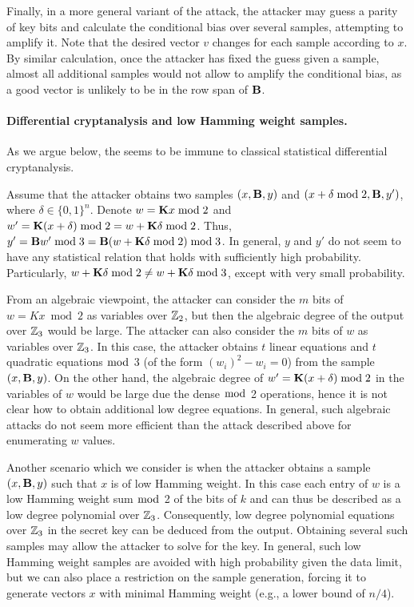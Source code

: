 Finally, in a more general variant of the attack,
the attacker may guess a parity of key bits and calculate the conditional bias over several samples,
attempting to amplify it.
Note that the desired vector $v$ changes for each sample according to $x$.
By similar calculation, once the attacker has fixed the guess given a sample,
almost all additional samples would not allow to amplify the conditional bias,
as a good vector is unlikely to be in the row span of $\mat{B}$.

\paragraph{Differential cryptanalysis and low Hamming weight samples.}
As we argue below, the \ttwPRF seems to be immune to classical statistical differential cryptanalysis.

Assume that the attacker obtains two samples $(x,\mat{B},y)$ and $(x+\delta \bmod 2,\mat{B},y')$, where $\delta \in \{0,1\}^n$.
Denote $w = \mat{K} x \bmod 2$ and $w' = \mat{K} (x + \delta) \bmod 2 = w + \mat{K} \delta \bmod 2$.
Thus, $y' = \mat{B} w' \bmod 3 = \mat{B} (w + \mat{K} \delta \bmod 2 ) \bmod 3$.
In general, $y$ and $y'$ do not seem to have any statistical relation that holds with sufficiently high probability.
Particularly, $w + \mat{K} \delta \bmod 2 \neq w + \mat{K} \delta \bmod 3$,
except with very small probability.

From an algebraic viewpoint, the attacker can consider the $m$ bits of $w = K x \bmod 2$ as variables over $\mathbb{Z}_2$,
but then the algebraic degree of the output over $\mathbb{Z}_3$ would be large.
The attacker can also consider the $m$ bits of $w$ as variables over $\mathbb{Z}_3$.
In this case, the attacker obtains $t$ linear equations and $t$ quadratic equations $\bmod$ 3 (of the form $(w_i)^2 - w_i = 0$) from the sample $(x,\mat{B},y)$.
On the other hand, the algebraic degree of $w' = \mat{K} (x +\delta) \bmod 2$ in the variables of $w$ would be large due the dense $\bmod$ 2 operations,
hence it is not clear how to obtain additional low degree equations.
In general, such algebraic attacks do not seem more efficient than the attack described above for enumerating $w$ values.

Another scenario which we consider is when the attacker obtains a sample $(x,\mat{B},y)$
such that $x$ is of low Hamming weight. In this case each entry of $w$ is a low Hamming weight sum $\bmod$ 2
of the bits of $k$ and can thus be described as a low degree polynomial over $\mathbb{Z}_3$.
Consequently, low degree polynomial equations over $\mathbb{Z}_3$ in the secret key can be deduced from the output.
Obtaining several such samples may allow the attacker to solve for the key.
In general, such low Hamming weight samples are avoided with high probability given the data limit,
but we can also place a restriction on the sample generation, forcing it to generate vectors $x$
with minimal Hamming weight (e.g., a lower bound of $n/4$).



